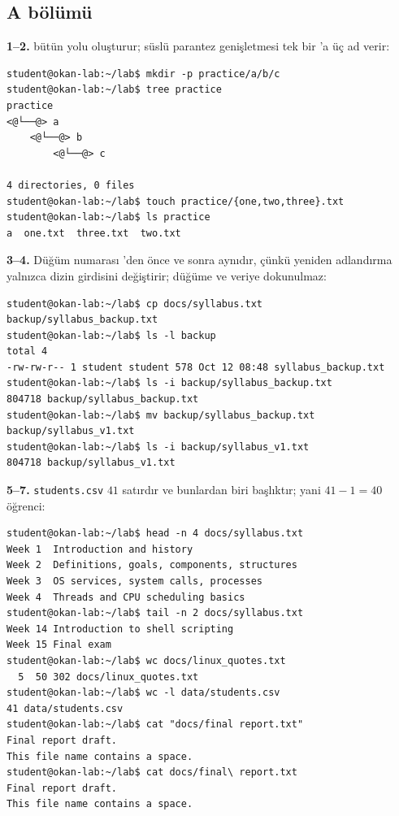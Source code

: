 \subsection*{A bölümü}

\textbf{1--2.}  bütün yolu oluşturur; süslü parantez genişletmesi tek bir 'a üç ad verir:
\begin{lstlisting}[style=term,basicstyle=\ttfamily\scriptsize\color{light}]
student@okan-lab:~/lab$ mkdir -p practice/a/b/c
student@okan-lab:~/lab$ tree practice
practice
<@└──@> a
    <@└──@> b
        <@└──@> c

4 directories, 0 files
student@okan-lab:~/lab$ touch practice/{one,two,three}.txt
student@okan-lab:~/lab$ ls practice
a  one.txt  three.txt  two.txt
\end{lstlisting}

\textbf{3--4.} Düğüm numarası 'den önce ve sonra aynıdır, çünkü yeniden adlandırma yalnızca dizin girdisini değiştirir; düğüme ve veriye dokunulmaz:
\begin{lstlisting}[style=term,basicstyle=\ttfamily\scriptsize\color{light}]
student@okan-lab:~/lab$ cp docs/syllabus.txt backup/syllabus_backup.txt
student@okan-lab:~/lab$ ls -l backup
total 4
-rw-rw-r-- 1 student student 578 Oct 12 08:48 syllabus_backup.txt
student@okan-lab:~/lab$ ls -i backup/syllabus_backup.txt
804718 backup/syllabus_backup.txt
student@okan-lab:~/lab$ mv backup/syllabus_backup.txt backup/syllabus_v1.txt
student@okan-lab:~/lab$ ls -i backup/syllabus_v1.txt
804718 backup/syllabus_v1.txt
\end{lstlisting}

\textbf{5--7.} \texttt{students.csv} $41$ satırdır ve bunlardan biri başlıktır; yani $41 - 1 = 40$ öğrenci:
\begin{lstlisting}[style=term,basicstyle=\ttfamily\scriptsize\color{light}]
student@okan-lab:~/lab$ head -n 4 docs/syllabus.txt
Week 1  Introduction and history
Week 2  Definitions, goals, components, structures
Week 3  OS services, system calls, processes
Week 4  Threads and CPU scheduling basics
student@okan-lab:~/lab$ tail -n 2 docs/syllabus.txt
Week 14 Introduction to shell scripting
Week 15 Final exam
student@okan-lab:~/lab$ wc docs/linux_quotes.txt
  5  50 302 docs/linux_quotes.txt
student@okan-lab:~/lab$ wc -l data/students.csv
41 data/students.csv
student@okan-lab:~/lab$ cat "docs/final report.txt"
Final report draft.
This file name contains a space.
student@okan-lab:~/lab$ cat docs/final\ report.txt
Final report draft.
This file name contains a space.
\end{lstlisting}

